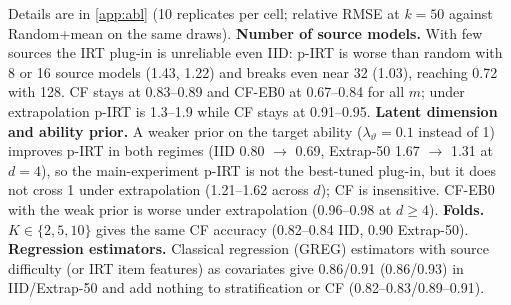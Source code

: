 Details are in \cref{app:abl} (10 replicates per cell; relative RMSE at $k=50$ against Random+mean on the same draws).
\textbf{Number of source models.} With few sources the IRT plug-in is unreliable even IID: p-IRT is worse than random with 8 or 16 source models (1.43, 1.22) and breaks even near 32 (1.03), reaching 0.72 with 128. CF stays at 0.83--0.89 and CF-EB0 at 0.67--0.84 for all $m$; under extrapolation p-IRT is 1.3--1.9 while CF stays at 0.91--0.95.
\textbf{Latent dimension and ability prior.} A weaker prior on the target ability ($\lambda_\vartheta=0.1$ instead of 1) improves p-IRT in both regimes (IID 0.80 $\to$ 0.69, Extrap-50 1.67 $\to$ 1.31 at $d=4$), so the main-experiment p-IRT is not the best-tuned plug-in, but it does not cross 1 under extrapolation (1.21--1.62 across $d$); CF is insensitive. CF-EB0 with the weak prior is worse under extrapolation (0.96--0.98 at $d\ge4$).
\textbf{Folds.} $K\in\{2,5,10\}$ gives the same CF accuracy (0.82--0.84 IID, 0.90 Extrap-50).
\textbf{Regression estimators.} Classical regression (GREG) estimators with source difficulty (or IRT item features) as covariates give 0.86/0.91 (0.86/0.93) in IID/Extrap-50 and add nothing to stratification or CF (0.82--0.83/0.89--0.91).

